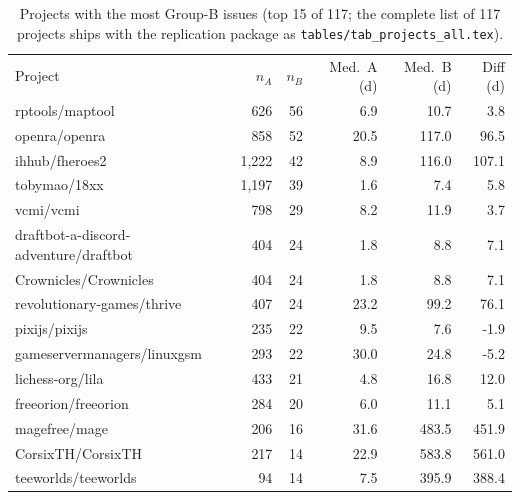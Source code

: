 \begin{table}[t]
\centering
\caption{Projects with the most Group-B issues (top 15 of 117; the complete list of 117 projects ships with the replication package as \texttt{tables/tab\_projects\_all.tex}).\label{tab:projects-top}}
\small \begin{tabular}{@{}lrrrrr@{}}
\toprule
Project & $n_A$ & $n_B$ & Med.\ A (d) & Med.\ B (d) & Diff (d) \\
rptools/maptool & 626 & 56 & 6.9 & 10.7 & 3.8 \\
openra/openra & 858 & 52 & 20.5 & 117.0 & 96.5 \\
ihhub/fheroes2 & 1,222 & 42 & 8.9 & 116.0 & 107.1 \\
tobymao/18xx & 1,197 & 39 & 1.6 & 7.4 & 5.8 \\
vcmi/vcmi & 798 & 29 & 8.2 & 11.9 & 3.7 \\
draftbot-a-discord-adventure/draftbot & 404 & 24 & 1.8 & 8.8 & 7.1 \\
Crownicles/Crownicles & 404 & 24 & 1.8 & 8.8 & 7.1 \\
revolutionary-games/thrive & 407 & 24 & 23.2 & 99.2 & 76.1 \\
pixijs/pixijs & 235 & 22 & 9.5 & 7.6 & -1.9 \\
gameservermanagers/linuxgsm & 293 & 22 & 30.0 & 24.8 & -5.2 \\
lichess-org/lila & 433 & 21 & 4.8 & 16.8 & 12.0 \\
freeorion/freeorion & 284 & 20 & 6.0 & 11.1 & 5.1 \\
magefree/mage & 206 & 16 & 31.6 & 483.5 & 451.9 \\
CorsixTH/CorsixTH & 217 & 14 & 22.9 & 583.8 & 561.0 \\
teeworlds/teeworlds & 94 & 14 & 7.5 & 395.9 & 388.4 \\
\bottomrule
\end{tabular}
\end{table}
